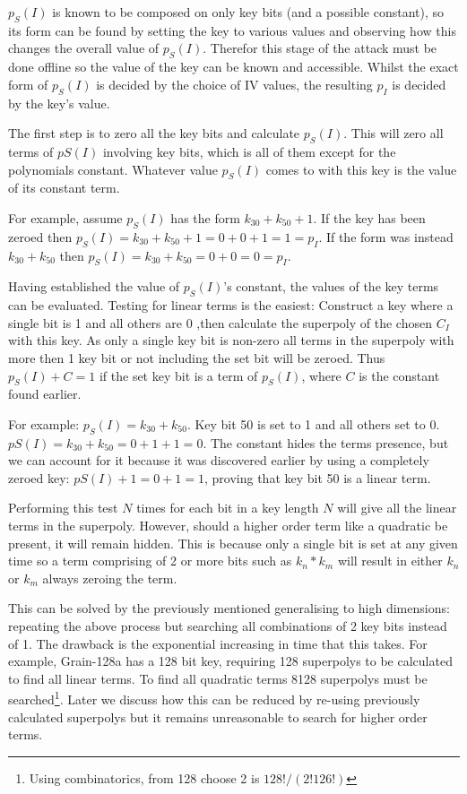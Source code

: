 \documentclass{report}
\begin{document}
$p_S(I)$ is known to be composed on only key bits (and a possible constant), so its form can be found by setting the key to various values and observing how this changes the overall value of $p_S(I)$. Therefor this stage of the attack must be done offline so the value of the key can be known and accessible. Whilst the exact form of $p_S(I)$ is decided by the choice of IV values, the resulting $p_I$ is decided by the key's value.

The first step is to zero all the key bits and calculate $p_S(I)$. This will zero all terms of $pS(I)$ involving key bits, which is all of them except for the polynomials constant. Whatever value $p_S(I)$ comes to with this key is the value of its constant term.

For example, assume $p_S(I)$ has the form $k_{30}+k_{50}+1$. If the key has been zeroed then $p_S(I)=k_{30}+k_{50}+1=0+0+1=1=p_I$. If the form was instead $k_{30}+k_{50}$ then $p_S(I)=k_{30}+k_{50}=0+0=0=p_I$.

Having established the value of $p_S(I)$'s constant, the values of the key terms can be evaluated. Testing for linear terms is the easiest: Construct a key where a single bit is 1 and all others are 0 ,then calculate the superpoly of the chosen $C_I$ with this key. As only a single key bit is non-zero all terms in the superpoly with more then 1 key bit or not including the set bit will be zeroed. Thus $p_S(I)+C=1$ if the set key bit is a term of $p_S(I)$, where $C$ is the constant found earlier.

For example: $p_S(I)=k_{30}+k_{50}$. Key bit 50 is set to 1 and all others set to 0. $pS(I)=k_{30}+k_{50}=0+1+1=0$. The constant hides the terms presence, but we can account for it because it was discovered earlier by using a completely zeroed key: $pS(I)+1=0+1=1$, proving that key bit 50 is a linear term.

Performing this test $N$ times for each bit in a key length $N$ will give all the linear terms in the superpoly. However, should a higher order term like a quadratic be present, it will remain hidden. This is because only a single bit is set at any given time so a term comprising of 2 or more bits such as $k_n*k_m$ will result in either $k_n$ or $k_m$ always zeroing the term.

This can be solved by the previously mentioned generalising to high dimensions: repeating the above process but searching all combinations of 2 key bits instead of 1. The drawback is the exponential increasing in time that this takes. For example, Grain-128a has a 128 bit key, requiring 128 superpolys to be calculated to find all linear terms. To find all quadratic terms 8128 superpolys must be searched\footnote{Using combinatorics, from 128 choose 2 is $128!/(2!126!)$}. Later we discuss how this can be reduced by re-using previously calculated superpolys but it remains unreasonable to search for higher order terms.
\end{document}
